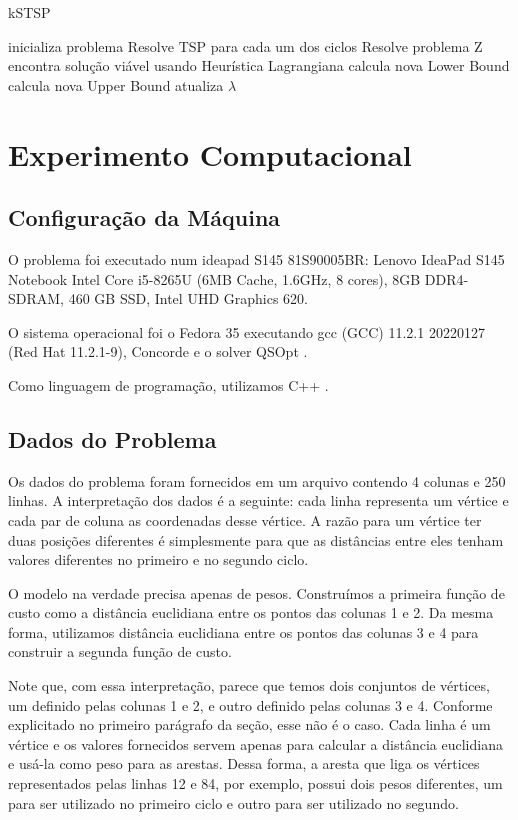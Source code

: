 \documentclass{article}
\newcommand{\lagrange}{\ensuremath{\lambda}}
\begin{document}
\begin{algorithm}
\caption{kSTSP}
\begin{algorithmic}
    \STATE inicializa problema
    \STATE Resolve TSP para cada um dos ciclos
    \STATE Resolve problema Z
    \STATE encontra solução viável usando Heurística Lagrangiana
    \STATE calcula nova Lower Bound
    \STATE calcula nova Upper Bound
    \STATE atualiza $\lagrange$
    \ENDWHILE
\end{algorithmic}
\end{algorithm}

\section{Experimento Computacional}

\subsection{Configuração da Máquina}

O problema foi executado num ideapad S145 81S90005BR: Lenovo IdeaPad S145 Notebook Intel Core i5-8265U (6MB Cache, 1.6GHz, 8 cores), 8GB DDR4-SDRAM, 460 GB SSD, Intel UHD Graphics 620.

O sistema operacional foi o Fedora 35 executando gcc (GCC) 11.2.1 20220127 (Red Hat 11.2.1-9), Concorde \cite{bib:concorde} e o solver QSOpt \cite{bib:qsopt}.

Como linguagem de programação, utilizamos C++ \cite{bib:cpp}.


\subsection{Dados do Problema}

Os dados do problema foram fornecidos em um arquivo contendo 4 colunas e 250 linhas. A interpretação dos dados é a seguinte: cada linha representa um vértice e cada par de coluna as coordenadas desse vértice. A razão para um vértice ter duas posições diferentes é simplesmente para que as distâncias entre eles tenham valores diferentes no primeiro e no segundo ciclo.

O modelo na verdade precisa apenas de pesos. Construímos a primeira função de custo como a distância euclidiana entre os pontos das colunas 1 e 2. Da mesma forma, utilizamos distância euclidiana entre os pontos das colunas 3 e 4 para construir a segunda função de custo.

Note que, com essa interpretação, parece que temos dois conjuntos de vértices, um definido pelas colunas 1 e 2, e outro definido pelas colunas 3 e 4. Conforme explicitado no primeiro parágrafo da seção, esse não é o caso. Cada linha é um vértice e os valores fornecidos servem apenas para calcular a distância euclidiana e usá-la como peso para as arestas. Dessa forma, a aresta que liga os vértices representados pelas linhas 12 e 84, por exemplo, possui dois pesos diferentes, um para ser utilizado no primeiro ciclo e outro para ser utilizado no segundo.
\end{document}
